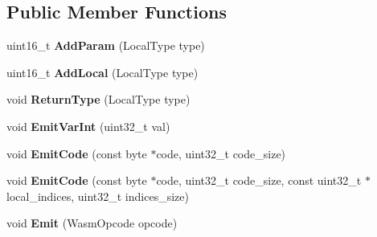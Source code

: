 \subsection*{Public Member Functions}
\begin{DoxyCompactItemize}
\item 
uint16\+\_\+t {\bfseries Add\+Param} (Local\+Type type)\hypertarget{classv8_1_1internal_1_1wasm_1_1_wasm_function_builder_afd04319bd075c728774f9c3413fc928e}{}\label{classv8_1_1internal_1_1wasm_1_1_wasm_function_builder_afd04319bd075c728774f9c3413fc928e}

\item 
uint16\+\_\+t {\bfseries Add\+Local} (Local\+Type type)\hypertarget{classv8_1_1internal_1_1wasm_1_1_wasm_function_builder_abe5ced9b229bc8f47c81306f8fdf1839}{}\label{classv8_1_1internal_1_1wasm_1_1_wasm_function_builder_abe5ced9b229bc8f47c81306f8fdf1839}

\item 
void {\bfseries Return\+Type} (Local\+Type type)\hypertarget{classv8_1_1internal_1_1wasm_1_1_wasm_function_builder_a5236db09948cbcd68390637a058f6165}{}\label{classv8_1_1internal_1_1wasm_1_1_wasm_function_builder_a5236db09948cbcd68390637a058f6165}

\item 
void {\bfseries Emit\+Var\+Int} (uint32\+\_\+t val)\hypertarget{classv8_1_1internal_1_1wasm_1_1_wasm_function_builder_a2ddf7386f2c11a791ecd416d5e10c9f8}{}\label{classv8_1_1internal_1_1wasm_1_1_wasm_function_builder_a2ddf7386f2c11a791ecd416d5e10c9f8}

\item 
void {\bfseries Emit\+Code} (const byte $\ast$code, uint32\+\_\+t code\+\_\+size)\hypertarget{classv8_1_1internal_1_1wasm_1_1_wasm_function_builder_a57f2b2c5fd928b697311b8f81ca2a044}{}\label{classv8_1_1internal_1_1wasm_1_1_wasm_function_builder_a57f2b2c5fd928b697311b8f81ca2a044}

\item 
void {\bfseries Emit\+Code} (const byte $\ast$code, uint32\+\_\+t code\+\_\+size, const uint32\+\_\+t $\ast$local\+\_\+indices, uint32\+\_\+t indices\+\_\+size)\hypertarget{classv8_1_1internal_1_1wasm_1_1_wasm_function_builder_aebf8d6ac9c3b6e310093fd8ad1ed2ea4}{}\label{classv8_1_1internal_1_1wasm_1_1_wasm_function_builder_aebf8d6ac9c3b6e310093fd8ad1ed2ea4}

\item 
void {\bfseries Emit} (Wasm\+Opcode opcode)\hypertarget{classv8_1_1internal_1_1wasm_1_1_wasm_function_builder_afcf948a734fad5c6b0d2891d5a0aa2fe}{}\label{classv8_1_1internal_1_1wasm_1_1_wasm_function_builder_afcf948a734fad5c6b0d2891d5a0aa2fe}


\end{DoxyCompactItemize}
